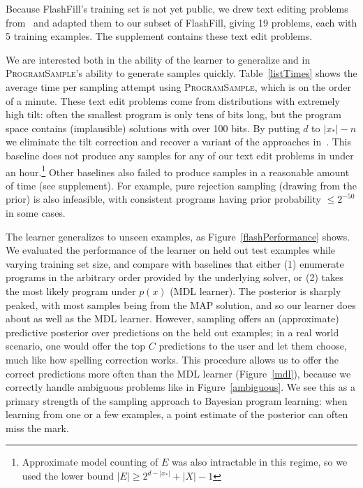 \documentclass{article}
\newcommand{\theSystem}{\textsc{ProgramSample}}
\begin{document}
Because FlashFill's training set is not yet public, we drew text editing problems from~\cite{DBLP:conf/ecai/LinDETM14} and adapted them to our subset of FlashFill, giving 19 problems, each with 5 training examples.
The supplement contains these text edit problems.

We are interested both in the ability of the learner to generalize
and in \theSystem{}'s ability to generate samples quickly.
Table~\ref{listTimes} shows the average time per sampling attempt using \theSystem{}, which is on the order of a minute.
These text edit problems come from distributions with extremely high tilt: often the smallest program is only tens of  bits long, but the program space contains (implausible) solutions with over 100 bits.
 By putting $d$ to $\lvert x_* \rvert -n$ we eliminate the tilt correction and recover a variant of the approaches in~\cite{ermon2013embed}. %
 This baseline does not produce any samples for any of our text edit problems in under an hour.\footnote{Approximate model counting of $E$ was also intractable in this regime, so we used the lower bound $|E|\geq 2^{d-\lvert x_* \rvert } + |X| - 1$}
 Other baselines also failed to produce samples in a reasonable amount of time (see supplement).
 For example, pure rejection sampling (drawing from the prior) is also infeasible,
 with consistent programs having prior probability $\leq 2^{-50}$ in some cases.


The learner generalizes to unseen examples, as
Figure~\ref{flashPerformance} shows.  We evaluated the performance of
the learner on held out test examples while varying training set size,
and compare with baselines that either (1) enumerate programs in the
arbitrary order provided by the underlying solver, or (2) takes the
most likely program under $p(x)$ (MDL learner).  The posterior is
sharply peaked, with most samples being from the MAP solution, and so
our learner does about as well as the MDL learner.  However, sampling
offers an (approximate) predictive posterior over predictions on the
held out examples; in a real world scenario, one would offer the top
$C$ predictions to the user and let them choose, much like how spelling
correction works.  This procedure allows us to offer the correct
predictions more often than the MDL learner (Figure~\ref{mdl}), because
we correctly handle ambiguous problems like in Figure~\ref{ambiguous}.
We see this as a primary strength of the sampling approach to Bayesian
program learning: when learning from one or a few examples, a point
estimate of the posterior can often miss the mark.
\end{document}
